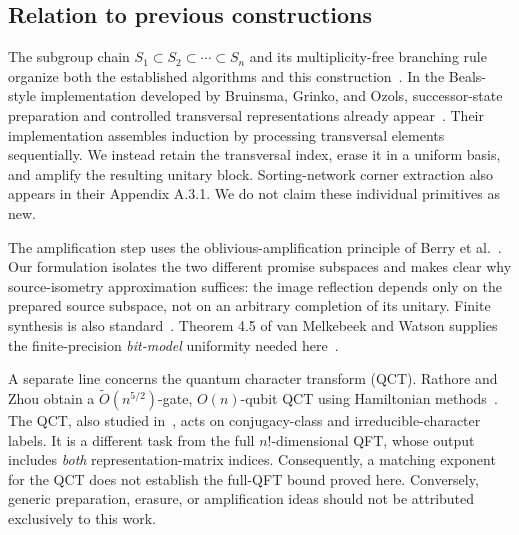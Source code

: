 \documentclass[11pt]{article}
\theoremstyle{definition}
\newcommand{\softO}{\widetilde O}
\begin{document}
\subsection{Relation to previous constructions}\label{sec:related}

The subgroup chain
$S_1\subset S_2\subset\cdots\subset S_n$
and its multiplicity-free branching rule organize both the established
algorithms and this construction~\cite{beals,mrr,bgo,toolbox}.
In the Beals-style implementation developed by Bruinsma, Grinko, and
Ozols, successor-state preparation and controlled transversal
representations already appear~\cite[Section 4 and Appendix A.2]{bgo}.
Their implementation assembles induction by processing transversal
elements sequentially. We instead retain the transversal index, erase it
in a uniform basis, and amplify the resulting unitary block.
Sorting-network corner extraction also appears in their
Appendix A.3.1. We do not claim these individual primitives as new.

The amplification step uses the oblivious-amplification principle of
Berry et al.~\cite[Lemma 3.6]{oaa}. Our formulation isolates the two
different promise subspaces and makes clear why source-isometry
approximation suffices: the image reflection depends only on the
prepared source subspace, not on an arbitrary completion of its unitary.
Finite synthesis is also standard~\cite{sk,mw}. Theorem 4.5 of
van Melkebeek and Watson supplies the finite-precision \emph{bit-model}
uniformity needed here~\cite{mw}.

A separate line concerns the quantum character transform (QCT).
Rathore and Zhou obtain a $\softO(n^{5/2})$-gate, $O(n)$-qubit QCT
using Hamiltonian methods~\cite[Theorem 5.1]{rz}.
The QCT, also studied in~\cite{qct},
acts on conjugacy-class and irreducible-character labels.
It is a different task from the full $n!$-dimensional QFT, whose output
includes \emph{both} representation-matrix indices.
Consequently, a matching exponent for the QCT does not establish the
full-QFT bound proved here. Conversely, generic preparation, erasure,
or amplification ideas should not be attributed exclusively to this work.
\end{document}
